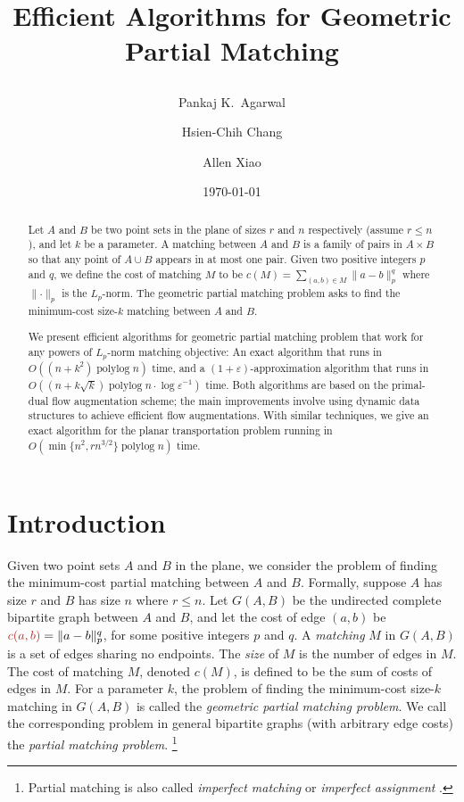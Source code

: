 \documentclass[11pt]{article}
\title{Efficient Algorithms for Geometric Partial Matching%
\date{\today} %
\author{
Pankaj K.\ Agarwal
\and
Hsien-Chih Chang
\and
Allen Xiao
}
}
\def\polylog{\mathop{\mathrm{polylog}}}
\def\eps{\varepsilon}
\def\norm#1{\mathopen\| #1 \mathclose\|}	%
\def\cost{c}
\numberwithin{figure}{section}
\def\EMPH#1{\textcolor{BrickRed}{{\emph{#1}}}}
\begin{document}
\maketitle

\begin{abstract}
Let $A$ and $B$ be two point sets in the plane of sizes $r$ and $n$ respectively (assume $r \leq n$), and let $k$ be a parameter.
A matching between $A$ and $B$ is a family of pairs in $A \times B$ so that any point of $A \cup B$ appears in at most one pair.
Given two positive integers $p$ and $q$, we define the cost of matching $M$ to be $\cost(M) = \sum_{(a, b) \in M}\norm{a-b}_p^q$ where $\norm{\cdot}_p$ is the $L_p$-norm.
The geometric partial matching problem asks to find the minimum-cost size-$k$ matching between $A$ and $B$.

We present efficient algorithms for geometric partial matching problem that work for any powers of $L_p$-norm matching objective:
An exact algorithm that runs in $O((n + k^2)\polylog n)$ time, and a $(1 + \eps)$-approximation algorithm that runs in $O((n + k\sqrt{k})\polylog n \cdot \log\eps^{-1})$ time.
Both algorithms are based on the primal-dual flow augmentation scheme; the main improvements involve using dynamic data structures to achieve efficient flow augmentations.
With similar techniques, we give an exact algorithm for the planar transportation problem running in $O(\min\{n^2, rn^{3/2}\}\polylog n)$ time.
\end{abstract}


\section{Introduction}

Given two point sets $A$ and $B$ in the plane, we consider the problem of finding
the minimum-cost partial matching between $A$ and $B$.
Formally, suppose $A$ has size $r$ and $B$ has size $n$ where $r \leq n$.
Let $G(A, B)$ be the undirected complete bipartite graph between
$A$ and $B$, and let the cost of edge $(a, b)$ be
$\EMPH{$c(a, b)$} = \norm{a-b}_p^q$, for some positive integers $p$ and $q$.
A \EMPH{matching} $M$ in $G(A, B)$ is a set of edges sharing no endpoints.
The \EMPH{size} of $M$ is the number of edges in $M$.
The cost of matching $M$, denoted \EMPH{$\cost(M)$}, is defined to be the sum of costs of edges in $M$.
For a parameter $k$, the problem of finding the minimum-cost
size-$k$ matching in $G(A, B)$ is called the \EMPH{geometric partial matching problem}.
We call the corresponding problem in general bipartite graphs (with arbitrary
edge costs) the \EMPH{partial matching problem}.%
\footnote{Partial matching is also called \EMPH{imperfect matching} or \EMPH{imperfect assignment} \cite{RT12,GHKT17}.}
\end{document}
